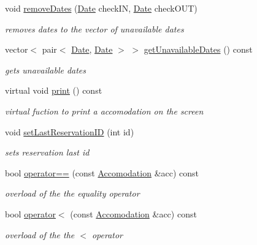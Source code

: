\begin{DoxyCompactItemize}
void \hyperlink{class_accomodation_ad77bdf46460657e8670001c91bce72b3}{remove\+Dates} (\hyperlink{class_date}{Date} check\+IN, \hyperlink{class_date}{Date} check\+O\+UT)
\begin{DoxyCompactList}\small\item\em removes dates to the vector of unavailable dates \end{DoxyCompactList}\item 
vector$<$ pair$<$ \hyperlink{class_date}{Date}, \hyperlink{class_date}{Date} $>$ $>$ \hyperlink{class_accomodation_a63c58fd6e01101095522573579490e7b}{get\+Unavailable\+Dates} () const
\begin{DoxyCompactList}\small\item\em gets unavailable dates \end{DoxyCompactList}\item 
\hypertarget{class_accomodation_ac38668edd6b7cd608dc9e8ab9a780efb}{}\label{class_accomodation_ac38668edd6b7cd608dc9e8ab9a780efb} 
virtual void \hyperlink{class_accomodation_ac38668edd6b7cd608dc9e8ab9a780efb}{print} () const
\begin{DoxyCompactList}\small\item\em virtual fuction to print a accomodation on the screen \end{DoxyCompactList}\item 
void \hyperlink{class_accomodation_a6801983a50d805b975b50950c22f8c61}{set\+Last\+Reservation\+ID} (int id)
\begin{DoxyCompactList}\small\item\em sets reservation last id \end{DoxyCompactList}\item 
bool \hyperlink{class_accomodation_ae42299afc3f8bf211fe69821f876d48a}{operator==} (const \hyperlink{class_accomodation}{Accomodation} \&acc) const
\begin{DoxyCompactList}\small\item\em overload of the the equality operator \end{DoxyCompactList}\item 
bool \hyperlink{class_accomodation_a7b5ccdc621aaf7c3dbe21800da6988c2}{operator$<$} (const \hyperlink{class_accomodation}{Accomodation} \&acc) const
\begin{DoxyCompactList}\small\item\em overload of the the $<$ operator \end{DoxyCompactList}\end{DoxyCompactItemize}
